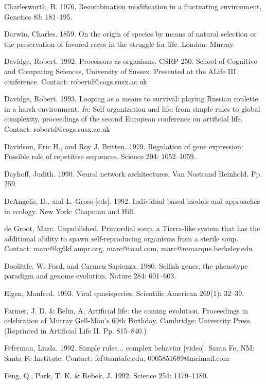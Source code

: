 \begin{thebibliography}{99}
Charlesworth, B.  1976. Recombination modification in a fluctuating
environment, Genetics 83: 181--195.

Darwin, Charles.  1859.  On the origin of species by means of natural
selection or the preservation of favored races in the struggle for life.
London: Murray.

Davidge, Robert.  1992.  Processors as organisms.  CSRP 250.  School of
Cognitive and Computing Sciences, University of Sussex.  Presented at
the ALife III conference.  Contact: robertd@cogs.susx.ac.uk

Davidge, Robert.  1993.  Looping as a means to survival: playing Russian
roulette in a harsh environment.  {\em In}: Self organization and life:
from simple rules to global complexity, proceedings of the second
European conference on artificial life.  Contact: robertd@cogs.susx.ac.uk

Davidson, Eric H., and Roy J. Britten.  1979.  Regulation of gene expression:
Possible role of repetitive sequences.  Science 204: 1052--1059.

Dayhoff, Judith.  1990.  Neural network architectures.  Van Nostrand
Reinhold.  Pp. 259.

DeAngelis, D., and L. Gross [eds].  1992.  Individual based models
and approaches in ecology.  New York: Chapman and Hill.

de Groot, Marc.  Unpublished.  Primordial soup, a Tierra-like system that has
the additional ability to spawn self-reproducing organisms from a sterile
soup.  Contact: marc@kg6kf.ampr.org, marc@toad.com, marc@remarque.berkeley.edu

Doolittle, W. Ford, and Carmen Sapienza.  1980.  Selfish genes, the phenotype
paradigm and genome evolution.  Nature 284: 601--603.

Eigen, Manfred.  1993.  Viral quasispecies.  Scientific American 269(1):
32--39.

Farmer, J. D. \& Belin, A.  Artificial life: the coming evolution.
Proceedings in celebration of Murray Gell-Man's 60th Birthday.
Cambridge: University Press.  (Reprinted in Artificial Life II.
Pp. 815--840.)

Feferman, Linda.  1992.  Simple rules... complex behavior [video].
Santa Fe, NM: Santa Fe Institute.  Contact: fef@santafe.edu,
0005851689@mcimail.com

Feng, Q., Park, T. K. \& Rebek, J.  1992.  Science 254: 1179--1180.


\end{thebibliography}
